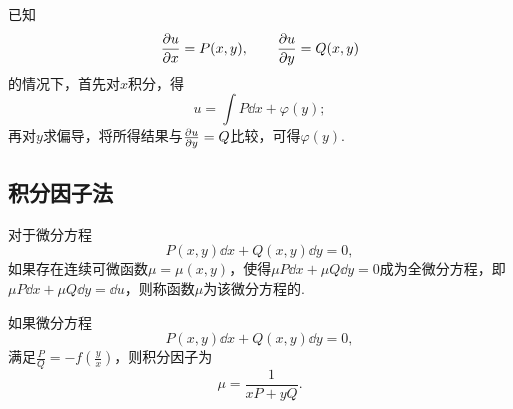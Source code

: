已知\[
\pdv{u}{x} = P(x,y),
\qquad
\pdv{u}{y} = Q(x,y)
\]的情况下，首先对\(x\)积分，得\[
u = \int P \dd{x} + \varphi(y);
\]再对\(y\)求偏导，将所得结果与\(\pdv{u}{y} = Q\)比较，可得\(\varphi(y)\).

\subsection{积分因子法}
对于微分方程\[
P(x,y)\dd{x} + Q(x,y)\dd{y} = 0,
\]如果存在连续可微函数\(\mu=\mu(x,y)\)，使得\(\mu P \dd{x} + \mu Q \dd{y} = 0\)成为全微分方程，即\(\mu P \dd{x} + \mu Q \dd{y} = \dd{u}\)，则称函数\(\mu\)为该微分方程的.

如果微分方程\[
P(x,y)\dd{x} + Q(x,y)\dd{y} = 0,
\]满足\(\frac{P}{Q}=-f\left(\frac{y}{x}\right)\)，则积分因子为\[
\mu = \frac{1}{xP+yQ}.
\]

